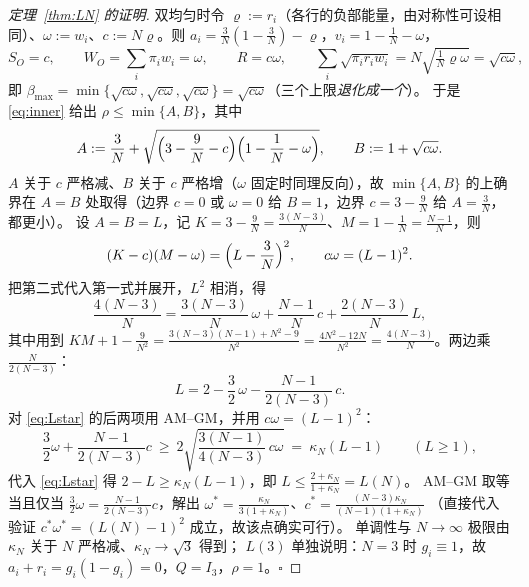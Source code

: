 \begin{proof}[定理~\ref{thm:LN} 的证明]
双均匀时令 $\varrho:=r_i$（各行的负部能量，由对称性可设相同）、$\omega:=w_i$、$c:=N\varrho$。则
$a_i=\frac3N(1-\frac3N)-\varrho$，$v_i=1-\frac1N-\omega$，
\[
S_O=c,\qquad W_O=\sum_i\pi_iw_i=\omega,\qquad R=c\omega,\qquad
\sum_i\sqrt{\pi_ir_iw_i}=N\sqrt{\tfrac1N\varrho\omega}=\sqrt{c\omega},
\]
即 $\beta_{\max}=\min\{\sqrt{c\omega},\sqrt{c\omega},\sqrt{c\omega}\}=\sqrt{c\omega}$（三个上限\emph{退化成一个}）。
于是 \eqref{eq:inner} 给出 $\rho\le\min\{A,B\}$，其中
\[
A:=\frac3N+\sqrt{\Bigl(3-\frac9N-c\Bigr)\Bigl(1-\frac1N-\omega\Bigr)},\qquad
B:=1+\sqrt{c\omega}.
\]
$A$ 关于 $c$ 严格减、$B$ 关于 $c$ 严格增（$\omega$ 固定时同理反向），故 $\min\{A,B\}$ 的上确界在
$A=B$ 处取得（边界 $c=0$ 或 $\omega=0$ 给 $B=1$，边界 $c=3-\frac9N$ 给 $A=\frac3N$，都更小）。
设 $A=B=L$，记 $K=3-\frac9N=\frac{3(N-3)}N$、$M=1-\frac1N=\frac{N-1}N$，则
\[
(K-c)(M-\omega)=\Bigl(L-\frac3N\Bigr)^2,\qquad c\omega=(L-1)^2 .
\]
把第二式代入第一式并展开，$L^2$ 相消，得
\[
\frac{4(N-3)}N=\frac{3(N-3)}N\,\omega+\frac{N-1}N\,c+\frac{2(N-3)}N\,L,
\]
其中用到 $KM+1-\frac9{N^2}=\frac{3(N-3)(N-1)+N^2-9}{N^2}=\frac{4N^2-12N}{N^2}=\frac{4(N-3)}N$。两边乘 $\frac{N}{2(N-3)}$：
\begin{equation}\label{eq:Lstar}
L=2-\frac32\,\omega-\frac{N-1}{2(N-3)}\,c .
\end{equation}
对 \eqref{eq:Lstar} 的后两项用 AM--GM，并用 $c\omega=(L-1)^2$：
\[
\frac32\omega+\frac{N-1}{2(N-3)}c\ \ge\ 2\sqrt{\frac{3(N-1)}{4(N-3)}\,c\omega}
\ =\ \kappa_N(L-1)\qquad(L\ge1),
\]
代入 \eqref{eq:Lstar} 得 $2-L\ge\kappa_N(L-1)$，即 $L\le\frac{2+\kappa_N}{1+\kappa_N}=L(N)$。
AM--GM 取等当且仅当 $\frac32\omega=\frac{N-1}{2(N-3)}c$，解出
$\omega^*=\frac{\kappa_N}{3(1+\kappa_N)}$、$c^*=\frac{(N-3)\kappa_N}{(N-1)(1+\kappa_N)}$
（直接代入验证 $c^*\omega^*=(L(N)-1)^2$ 成立，故该点确实可行）。
单调性与 $N\to\infty$ 极限由 $\kappa_N$ 关于 $N$ 严格减、$\kappa_N\to\sqrt3$ 得到；
$L(3)$ 单独说明：$N=3$ 时 $g_i\equiv1$，故 $a_i+r_i=g_i(1-g_i)=0$，$Q=I_3$，$\rho=1$。$\square$
\end{proof}
